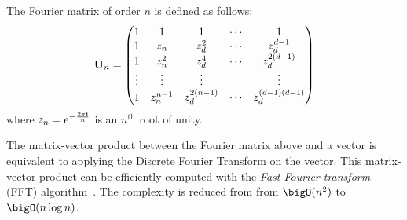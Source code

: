 \begin{definition}
  The Fourier matrix of order $n$ is defined as follows:
  \begin{equation} \label{definition:ch2-fourier_matrix}
    \mathbf{U}_n = 
    \begin{pmatrix}
      1      & 1           & 1              & \cdots & 1           \\
      1      & z_n       & z_d^2        & \cdots & z_d^{d-1} \\
      1      & z_n^2     & z_d^4        & \cdots & z_d^{2(d-1)} \\
      \vdots & \vdots      & \vdots         &        & \vdots      \\
      1      & z_n^{n-1} & z_d^{2(n-1)} & \cdots & z_d^{(d-1)(d-1)}
    \end{pmatrix}
  \end{equation}
  where $z_n = e^{-\frac{2\pi\mathbf{i}}{n}}$ is an $n^{\text{th}}$ root of unity.
\end{definition}
\noindent
The matrix-vector product between the Fourier matrix above and a vector is equivalent to applying the Discrete Fourier Transform on the vector.
This matrix-vector product can be efficiently computed with the \emph{Fast Fourier transform} (FFT) algorithm~\cite{cooley1965algorithm}.
The complexity is reduced from from $\bigO(n^2)$ to $\bigO(n \log n)$.

